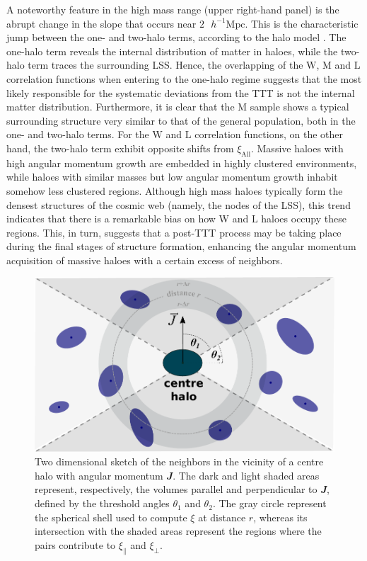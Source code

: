 \documentclass[fleqn,usenatbib]{mnras}
\newcommand{\hMpc}{{\textrm{ $h^{-1}$Mpc}}}
\newcommand{\Wh}{\mathrm{W}}
\newcommand{\Lh}{\mathrm{L}}
\newcommand{\Mh}{\mathrm{M}}
\begin{document}
A noteworthy feature in the high mass range (upper right-hand panel) is the abrupt change in the slope that occurs near $2\hMpc$. This is the characteristic jump between the one- and two-halo terms, according to the halo model \citep{coorayysheth2002}. The one-halo term reveals the internal distribution of matter in haloes, while the two-halo term traces the surrounding LSS. Hence, the overlapping of the $\Wh$, $\Mh$ and $\Lh$ correlation functions when entering to the one-halo regime suggests that the most likely responsible for the systematic deviations from the TTT is not the internal matter distribution. Furthermore, it is clear that the $\Mh$ sample shows a typical surrounding structure very similar to that of the general population, both in the one- and two-halo terms. For the $\Wh$ and $\Lh$ correlation functions, on the other hand, the two-halo term exhibit opposite shifts from $\xi_\mathrm{All}$. Massive haloes with high angular momentum growth are embedded in highly clustered environments, while haloes with similar masses but low angular momentum growth inhabit somehow less clustered regions. Although high mass haloes typically form the densest structures of the cosmic web (namely, the nodes of the LSS), this trend indicates that there is a remarkable bias on how $\Wh$ and $\Lh$ haloes occupy these regions. This, in turn, suggests that a post-TTT process may be taking place during the final stages of structure formation, enhancing the angular momentum acquisition of massive haloes with a certain excess of neighbors. 

\begin{figure}
	\includegraphics[width=\columnwidth]{400Mpc_figs/esquema_funcion_correlacion.pdf}
    \caption{Two dimensional sketch of the neighbors in the vicinity of a centre halo with angular momentum $\mathbfit{J}$. The dark and light shaded areas represent, respectively, the volumes parallel and perpendicular to $\mathbfit{J}$, defined by the threshold angles $\theta_1$ and $\theta_2$. The gray circle represent the spherical shell used to compute $\xi$ at distance $r$, whereas its intersection with the shaded areas represent the regions where the pairs contribute to $\xi_{\parallel}$ and $\xi_{\perp}$.}
    \label{fig:esquema_fca}
\end{figure}
\end{document}
